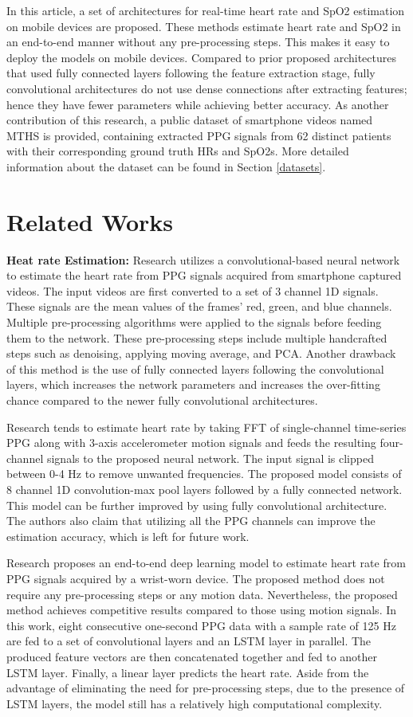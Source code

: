 \documentclass[conference]{IEEEtran}
\begin{document}
In this article, a set of architectures for real-time heart rate and SpO2 estimation on mobile devices are proposed. These methods estimate heart rate and SpO2 in an end-to-end manner without any pre-processing steps. This makes it easy to deploy the models on mobile devices. Compared to prior proposed architectures that used fully connected layers following the feature extraction stage, fully convolutional architectures do not use dense connections after extracting features; hence they have fewer parameters while achieving better accuracy. As another contribution of this research, a public dataset of smartphone videos named MTHS is provided, containing extracted PPG signals from 62 distinct patients with their corresponding ground truth HRs and SpO2s. More detailed information about the dataset can be found in Section \ref{datasets}. 

\section{Related Works}
\textbf{Heat rate Estimation:}
Research \cite{b8} utilizes a convolutional-based neural network to estimate the heart rate from PPG signals acquired from smartphone captured videos. The input videos are first converted to a set of 3 channel 1D signals. These signals are the mean values of the frames' red, green, and blue channels. Multiple pre-processing algorithms were applied to the signals before feeding them to the network. These pre-processing steps include multiple handcrafted steps such as denoising, applying moving average, and PCA. Another drawback of this method is the use of fully connected layers following the convolutional layers, which increases the network parameters and increases the over-fitting chance compared to the newer fully convolutional architectures.

Research \cite{b9} tends to estimate heart rate by taking FFT of single-channel time-series PPG along with 3-axis accelerometer motion signals and feeds the resulting four-channel signals to the proposed neural network. The input signal is clipped between 0-4 Hz to remove unwanted frequencies. The proposed model consists of  8 channel 1D convolution-max pool layers followed by a fully connected network. This model can be further improved by using fully convolutional architecture. The authors also claim that utilizing all the PPG channels can improve the estimation accuracy, which is left for future work.

Research \cite{b10} proposes an end-to-end deep learning model to estimate heart rate from PPG signals acquired by a wrist-worn device. The proposed method does not require any pre-processing steps or any motion data. Nevertheless, the proposed method achieves competitive results compared to those using motion signals. In this work, eight consecutive one-second PPG data with a sample rate of 125 Hz are fed to a set of convolutional layers and an LSTM layer in parallel. The produced feature vectors are then concatenated together and fed to another LSTM layer. Finally, a linear layer predicts the heart rate. Aside from the advantage of eliminating the need for pre-processing steps, due to the presence of LSTM layers, the model still has a relatively high computational complexity.
\end{document}
